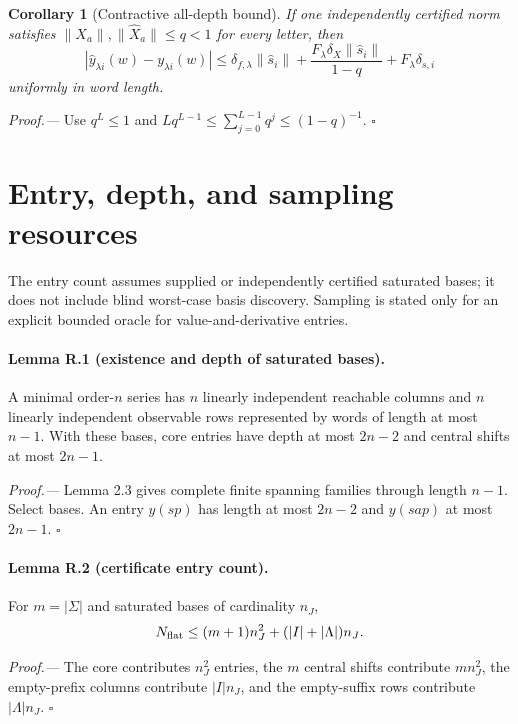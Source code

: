 \documentclass[aps,prl,reprint,superscriptaddress,nofootinbib]{revtex4-2}
\newtheorem{corollary}{Corollary}
\begin{document}
\begin{corollary}[Contractive all-depth bound]
\label{cor:contractive}
If one independently certified norm satisfies
$\|X_a\|,\|\widehat X_a\|\le q<1$ for every letter, then
\begin{equation}
 |\widehat y_{\lambda i}(w)-y_{\lambda i}(w)|
 \le \delta_{f,\lambda}\|\widehat s_i\|
 +\frac{F_\lambda\delta_X\|\widehat s_i\|}{1-q}
 +F_\lambda\delta_{s,i}
 \label{eq:contractive-bound}
\end{equation}
uniformly in word length.
\end{corollary}

\emph{Proof.---}
Use $q^L\le1$ and
$Lq^{L-1}\le\sum_{j=0}^{L-1}q^j\le(1-q)^{-1}$. \hfill$\square$

\section{Entry, depth, and sampling resources}
\label{sec:resource}

The entry count assumes supplied or independently certified saturated bases; it does not include blind worst-case basis discovery.  Sampling is stated only for an explicit bounded oracle for value-and-derivative entries.

\paragraph{Lemma R.1 (existence and depth of saturated bases).}
A minimal order-$n$ series has $n$ linearly independent reachable columns and $n$ linearly independent observable rows represented by words of length at most $n-1$.  With these bases, core entries have depth at most $2n-2$ and central shifts at most $2n-1$.

\emph{Proof.---}
Lemma 2.3 gives complete finite spanning families through length $n-1$.  Select bases.  An entry $y(sp)$ has length at most $2n-2$ and $y(sap)$ at most $2n-1$. \hfill$\square$

\paragraph{Lemma R.2 (certificate entry count).}
For $m=|\Sigma|$ and saturated bases of cardinality $n_J$,
\begin{equation}
 N_{\rm flat}\le(m+1)n_J^2+(|I|+|\Lambda|)n_J.
 \label{eq:Nflat-SM}
\end{equation}

\emph{Proof.---}
The core contributes $n_J^2$ entries, the $m$ central shifts contribute $mn_J^2$, the empty-prefix columns contribute $|I|n_J$, and the empty-suffix rows contribute $|\Lambda|n_J$. \hfill$\square$
\end{document}
